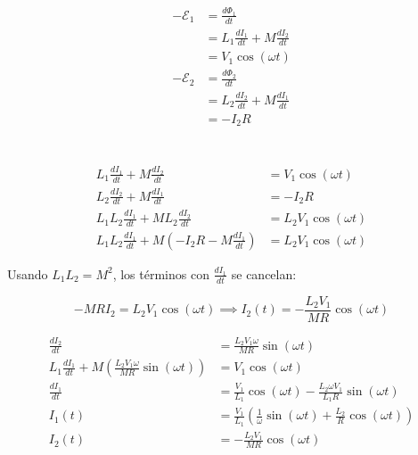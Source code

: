 \documentclass{report}
\begin{document}
\section{}

\begin{align*}
	-\mathcal{E}_1 &= \frac{d\Phi_1}{dt}\\
	&= L_1 \frac{dI_1}{dt} + M\frac{dI_2}{dt}\\
	&= V_1\cos(\omega t)\\
	-\mathcal{E}_2 &= \frac{d\Phi_2}{dt}\\
	&= L_2 \frac{dI_2}{dt} + M\frac{dI_1}{dt}\\
	&= -I_2R
\end{align*}

\section{}

\begin{align*}
	L_1 \frac{dI_1}{dt} + M \frac{dI_2}{dt} &= V_1 \cos(\omega t)\\
	L_2 \frac{dI_2}{dt} + M \frac{dI_1}{dt} &= -I_2 R\\
	L_1 L_2 \frac{dI_1}{dt} + M L_2 \frac{dI_2}{dt} &= L_2 V_1 \cos(\omega t)\\
	L_1 L_2 \frac{dI_1}{dt} + M(-I_2 R - M \frac{dI_1}{dt}) &= L_2 V_1 \cos(\omega t)
\end{align*}

Usando \(L_1 L_2 = M^2\), los términos con \(\frac{dI_1}{dt}\) se cancelan:  

\begin{equation*}
-M R I_2 = L_2 V_1 \cos(\omega t) \implies I_2(t) = -\frac{L_2 V_1}{M R} \cos(\omega t)
\end{equation*}

\begin{align*}
	\frac{dI_2}{dt} &= \frac{L_2 V_1 \omega}{M R} \sin(\omega t)\\
	L_1 \frac{dI_1}{dt} + M \left(\frac{L_2 V_1 \omega}{M R} \sin(\omega t)\right) &= V_1 \cos(\omega t)\\
	\frac{dI_1}{dt} &= \frac{V_1}{L_1} \cos(\omega t) - \frac{L_2 \omega V_1}{L_1 R} \sin(\omega t)\\
	I_1(t) &= \frac{V_1}{L_1} \left(\frac{1}{\omega} \sin(\omega t) + \frac{L_2}{R} \cos(\omega t)\right)\\
	I_2(t) &= -\frac{L_2 V_1}{M R} \cos(\omega t)
\end{align*}
\end{document}
